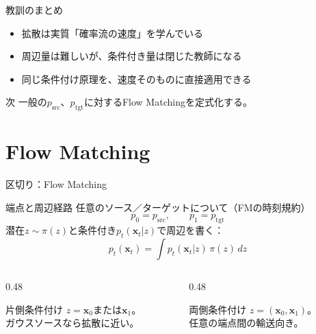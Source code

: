\asmain
\begin{frame}{教訓のまとめ}
    \begin{itemize}
        \item 拡散は実質「確率流の速度」を学んでいる
        \item 周辺量は難しいが、条件付き量は閉じた教師になる
        \item 同じ条件付け原理を、速度そのものに直接適用できる
    \end{itemize}
    \begin{block}{次}
        一般の$p_{\mathrm{src}}$、$p_{\mathrm{tgt}}$に対するFlow Matchingを定式化する。
    \end{block}
\end{frame}
\section{Flow Matching}
\asmain
\begin{frame}{区切り：Flow Matching}
    \tableofcontents[currentsection]
\end{frame}
\asmain
\begin{frame}{端点と周辺経路}
    任意のソース／ターゲットについて（FMの時刻規約）
    \[
        p_0=p_{\mathrm{src}},
        \qquad
        p_1=p_{\mathrm{tgt}}
        \tag{5.2.6}
    \]
    潜在$z\sim\pi(z)$と条件付き$p_t(\bm{x}_t|z)$で周辺を書く：
    \[
        p_t(\bm{x}_t)
        =
        \int p_t(\bm{x}_t|z)\,\pi(z)\,dz
        \tag{5.2.7}
    \]
    \begin{columns}[T,onlytextwidth]
        \begin{column}{0.48\textwidth}
            \begin{block}{片側条件付け}
                $z=\bm{x}_0$または$\bm{x}_1$。\\
                ガウスソースなら拡散に近い。
            \end{block}
        \end{column}
        \begin{column}{0.48\textwidth}
            \begin{block}{両側条件付け}
                $z=(\bm{x}_0,\bm{x}_1)$。\\
                任意の端点間の輸送向き。
            \end{block}
        \end{column}
    \end{columns}
\end{frame}
